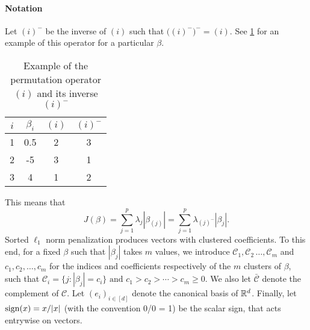 \paragraph{Notation}\label{sec:notation}

Let \((i)^{-}\) be the inverse of \((i)\) such that
\(\big((i)^-\big)^- = (i)\). See \cref{tab:permutation-example} for an
example of this operator for a particular \(\beta\).
\begin{table}
  \centering
  \caption{Example of the permutation operator \((i)\) and its inverse
    \((i)^-\)\label{tab:permutation-example}}
  \begin{tabular}{cccc}
    \toprule
    \(i\) & \(\beta_i\) & \((i)\) & \((i)^-\) \\
    \midrule
    1     & 0.5         & 2       & 3         \\
    2     & -5          & 3       & 1         \\
    3     & 4           & 1       & 2         \\
    \bottomrule
  \end{tabular}
\end{table}
This means that
\[
  J(\beta) = \sum_{j=1}^p \lambda_j |\beta_{(j)}|
  = \sum_{j=1}^p \lambda_{(j)^-}|\beta_j|.
\]
Sorted $\ell_1$ norm penalization produces vectors with clustered coefficients.
To this end, for a fixed $\beta$ such that $|\beta_j|$ takes $m$ values, we introduce \(\mathcal{C}_1, \mathcal{C}_2\, \dots, \mathcal{C}_m\) and \(c_1,
c_2, \dots, c_m\) for the indices and coefficients respectively of the \(m\)
clusters of $\beta$, such that
  $
  \mathcal{C}_i = \{j : |\beta_j| = c_i\} \text{ and }%
  c_1 > c_2 > \cdots > c_m \geq 0.
  $
We also let \(\bar{\mathcal{C}}\) denote the complement of \(\mathcal{C}\).
Let $(e_i)_{i \in [d]}$ denote the canonical basis of $\mathbb{R}^d$.
Finally, let $\operatorname{sign}(x) = x / |x|$ (with the convention 0/0 = 1) be the scalar sign, that acts entrywise on vectors.


